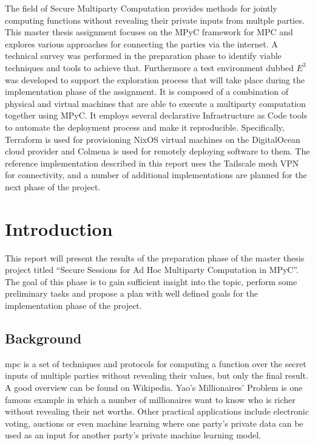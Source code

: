 The field of Secure Multiparty Computation provides methods for jointly
computing functions without revealing their private inputs from multple
parties. This master thesis assignment focuses on the MPyC framework for
MPC and explores various approaches for connecting the parties via the
internet. A technical survey was performed in the preparation phase to
identify viable techniques and tools to achieve that. Furthermore a test
environment dubbed \(E^3\) was developed to support the exploration
process that will take place during the implementation phase of the
assignment. It is composed of a combination of physical and virtual
machines that are able to execute a multiparty computation together
using MPyC. It employs several declarative Infrastructure as Code tools
to automate the deployment process and make it reproducible.
Specifically, Terraform is used for provisioning NixOS virtual machines
on the DigitalOcean cloud provider and Colmena is used for remotely
deploying software to them. The reference implementation described in
this report uses the Tailscale mesh VPN for connectivity, and a number
of additional implementations are planned for the next phase of the
project.

\hypertarget{introduction}{%
\chapter{Introduction}\label{introduction}}

This report will present the results of the preparation phase of the
master thesis project titled ``Secure Sessions for Ad Hoc Multiparty
Computation in MPyC''. The goal of this phase is to gain sufficient
insight into the topic, perform some preliminary tasks and propose a
plan with well defined goals for the implementation phase of the
project.

\hypertarget{background}{%
\section{Background}\label{background}}

\gls{mpc} is a set of techniques and protocols for computing a function
over the secret inputs of multiple parties without revealing their
values, but only the final result. A good overview can be found on
Wikipedia\autocite{wikiMPC}. Yao's Millionaires'
Problem\autocite{yaoProtocolsSecureComputations1982} is one famous
example in which a number of millionaires want to know who is richer
without revealing their net worths. Other practical
applications\autocite{laudApplicationsSecureMultiparty2015} include
electronic voting, auctions or even machine
learning\autocite{knottCrypTenSecureMultiParty2022} where one party's
private data can be used as an input for another party's private machine
learning model.

